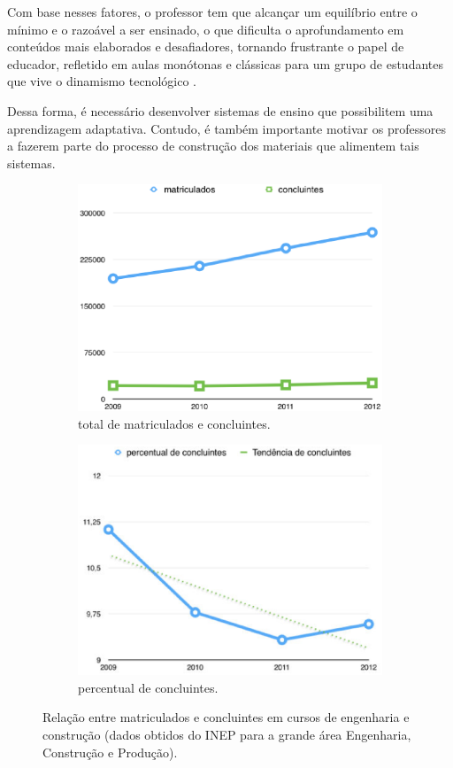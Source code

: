 Com base nesses fatores, o professor tem que alcançar um equilíbrio entre o mínimo e o razoável a ser ensinado, o que dificulta o aprofundamento em conteúdos mais elaborados e desafiadores, tornando frustrante o papel de educador, refletido em aulas monótonas e clássicas para um grupo de estudantes que vive o dinamismo tecnológico \cite{fragelli2010}. 

Dessa forma, é necessário desenvolver sistemas de ensino que possibilitem uma aprendizagem adaptativa. Contudo, é também importante motivar os professores a fazerem parte do processo de construção dos materiais que alimentem tais sistemas.

\begin{figure}[h!]
	\begin{subfigure}{.5\textwidth}
  		\centering
  		\includegraphics[width=.9\linewidth]{figuras/matriculados1.eps}
  		\caption{total de matriculados e concluintes.}
  		\label{fig:submat1}
	\end{subfigure}%
	\begin{subfigure}{.5\textwidth}
  		\centering
  		\includegraphics[width=.9\linewidth]{figuras/matriculados2.eps}
  		\caption{percentual de concluintes.}
  		\label{fig:submat2}
	\end{subfigure}
	\caption{Relação entre matriculados e concluintes em cursos de engenharia e construção
	(dados obtidos do INEP para a grande área Engenharia, Construção e Produção).}
	\label{fig:matriculados}
\end{figure}

